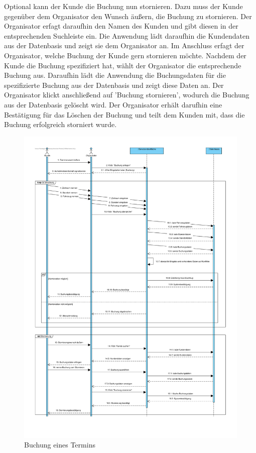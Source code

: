 Optional kann der Kunde die Buchung nun stornieren. Dazu muss der Kunde gegenüber dem Organisator den Wunsch äußern, die Buchung zu stornieren. Der Organisator erfagt daraufhin den Namen des Kunden und gibt diesen in der entsprechenden Suchleiste ein. Die Anwendung lädt daraufhin die Kundendaten aus der Datenbasis und zeigt sie dem Organisator an. Im Anschluss erfagt der Organisator, welche Buchung der Kunde gern stornieren möchte. Nachdem der Kunde die Buchung spezifiziert hat, wählt der Organisator die entsprechende Buchung aus. Daraufhin lädt die Anwendung die Buchungsdaten für die spezifizierte Buchung aus der Datenbasis und zeigt diese Daten an. Der Organisator klickt anschließend auf 'Buchung stornieren', wodurch die Buchung aus der Datenbasis gelöscht wird. Der Organisator erhält darufhin eine Bestätigung für das Löschen der Buchung und teilt dem Kunden mit, dass die Buchung erfolgreich storniert wurde. 

\newpage

\begin{figure}[!ht]
    \centering
    \includegraphics[width=\textwidth, height=\textheight-4cm]{Bilder/Diagramme/SD_Buchungsvorgang_01.pdf}
    \caption{Buchung eines Termins}
    \label{img:buchung01}
\end{figure}


